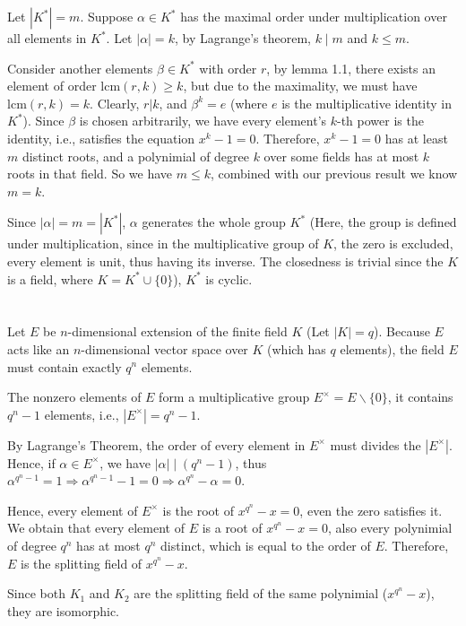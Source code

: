 \documentclass[12pt]{article}
\theoremstyle{definition}
\theoremstyle{remark}
\begin{document}
Let $|K^\ast|=m$. Suppose $\alpha\in K^\ast$ has the maximal order under multiplication over all elements in $K^\ast$. Let $|\alpha|=k$, by Lagrange's theorem, $k\mid m$ and $k\le m$.

Consider another elements $\beta\in K^\ast$ with order $r$, by lemma 1.1, there exists an element of order $\mathrm{lcm}(r,k)\ge k$, but due to the maximality, we must have $\mathrm{lcm}(r,k)=k$. Clearly, $r|k$, and $\beta^k=e$ (where $e$ is the multiplicative identity in $K^\ast$). Since $\beta$ is chosen arbitrarily, we have every element's $k$-th power is the identity, i.e., satisfies the equation $x^k-1=0$. Therefore, $x^k-1=0$ has at least $m$ distinct roots, and a polynimial of degree $k$ over some fields has at most $k$ roots in that field. So we have $m\le k$, combined with our previous result we know $m=k$. 

Since $|\alpha|=m=|K^\ast|$, $\alpha$ generates the whole group $K^\ast$ (Here, the group is defined under multiplication, since in the multiplicative group of $K$, the zero is excluded, every element is unit, thus having its inverse. The closedness is trivial since the $K$ is a field, where $K=K^\ast\cup \{0\}$), $K^\ast$ is cyclic.

\section{}
Let $E$ be $n$-dimensional extension of the finite field $K$ (Let $|K|=q$). Because $E$ acts like an $n$-dimensional vector space over $K$ (which has $q$ elements), the field $E$ must contain exactly $q^n$ elements.

The nonzero elements of $E$ form a multiplicative group $E^{\times}=E\backslash \{0\}$, it contains $q^n-1$ elements, i.e., $|E^{\times}|=q^n-1$.

By Lagrange's Theorem, the order of every element in $E^{\times}$ must divides the $|E^{\times}|$. Hence, if $\alpha\in E^{\times}$, we have $|\alpha|\mid (q^n-1)$, thus $\alpha^{q^n-1}=1\Rightarrow \alpha^{q^n-1}-1=0\Rightarrow \alpha^{q^n}-\alpha=0$.

Hence, every element of $E^{\times}$ is the root of $x^{q^n}-x=0$, even the zero satisfies it. We obtain that every element of $E$ is a root of $x^{q^n}-x=0$, also every polynimial of degree $q^n$ has at most $q^n$ distinct, which is equal to the order of $E$. Therefore, $E$ is the splitting field of $x^{q^n}-x$.

Since both $K_1$ and $K_2$ are the splitting field of the same polynimial ($x^{q^n}-x$), they are isomorphic.
\end{document}
